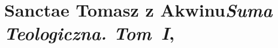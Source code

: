 \documentclass[a4paper,11pt]{article}
\numberwithin{equation}{section}
\begin{document}
\VerSpaceTwo










\section{Sanctae Tomasz z Akwinu\textit{Suma Teologiczna.
    Tom~I},
  \parencite{SancteTomaszZAkwinuSumaTeologicznaTomI1960}}








\newpage

\end{document}

